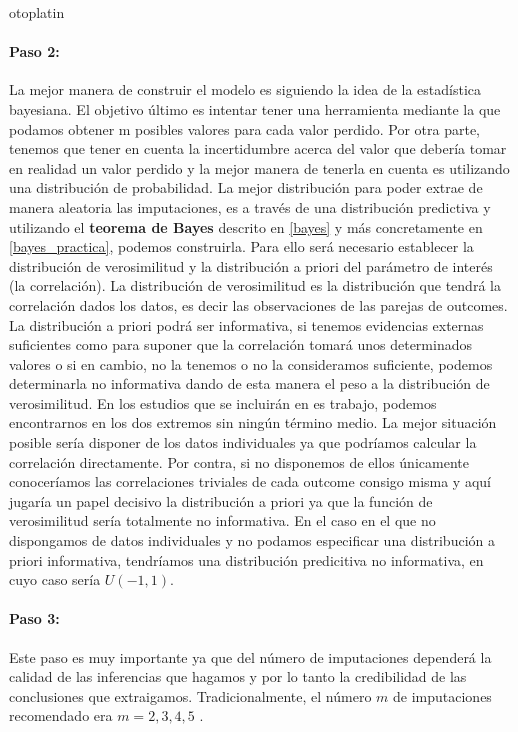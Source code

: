 otoplatin\documentclass[a4paper,openright,12pt]{report}
\begin{document}
\paragraph{Paso 2:}
La mejor manera de construir el modelo es siguiendo la idea de la estadística bayesiana. El objetivo último es intentar tener una herramienta mediante la que podamos obtener m posibles valores para cada valor perdido. Por otra parte, tenemos que tener en cuenta la incertidumbre acerca del valor que debería tomar en realidad un valor perdido y la mejor manera de tenerla en cuenta es utilizando una distribución de probabilidad.
La mejor distribución para poder extrae de manera aleatoria las imputaciones, es a través de una distribución predictiva y utilizando el \textbf{teorema de Bayes} descrito en \ref{bayes} y más concretamente en \ref{bayes_practica}, podemos construirla. Para ello será necesario establecer la distribución de verosimilitud y la distribución a priori del parámetro de interés (la correlación).
La distribución de verosimilitud es la distribución que tendrá la correlación dados los datos, es decir las observaciones de las parejas de outcomes. La distribución a priori podrá ser informativa, si tenemos evidencias externas suficientes como para suponer que la correlación tomará unos determinados valores o si en cambio, no la tenemos o no la consideramos suficiente, podemos determinarla no informativa dando de esta manera el peso a la distribución de verosimilitud.
En los estudios que se incluirán en es trabajo, podemos encontrarnos en los dos extremos sin ningún término medio. La mejor situación posible sería disponer de los datos individuales ya que podríamos calcular la correlación directamente. Por contra, si no disponemos de ellos únicamente conoceríamos las correlaciones triviales de cada outcome consigo misma y aquí jugaría un papel decisivo la distribución a priori ya que la función de verosimilitud sería totalmente no informativa. En el caso en el que no dispongamos de datos individuales y no podamos especificar una distribución a priori informativa, tendríamos una distribución predicitiva no informativa, en cuyo caso sería $U\left( -1,1\right)$. 

\paragraph{Paso 3:}

Este paso es muy importante ya que del número de imputaciones dependerá la calidad de las inferencias que hagamos y por lo tanto la credibilidad de las conclusiones que extraigamos. Tradicionalmente, el número $m$ de imputaciones recomendado era $m=2,3,4,5$ \cite{Rubin1987}\cite{Rubin1996}\cite{Schafer1997}\cite{Schafer1998}.
\end{document}
